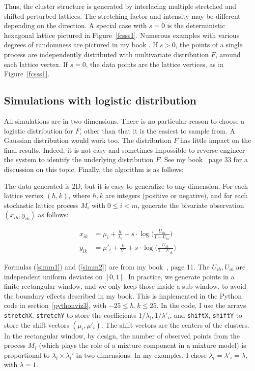 \documentclass[oneside,10pt]{book}
\begin{document}
Thus, the cluster structure is generated by interlacing multiple stretched and shifted perturbed lattices. The stretching factor and intensity may be different depending on the direction. A special case with $s=0$ is the deterministic hexagonal lattice pictured in Figure~\ref{fcsss1}. Numerous examples with various degrees of randomness are pictured in my book \cite{vgsimulnew}. If $s>0$, the points of a single process are independently distributed with multivariate distribution $F$, around each lattice vertex. If $s=0$, the data points are the lattice vertices, as in
Figure~\ref{fcsss1}.

\subsection{Simulations with logistic distribution}\label{fcsim}

All simulations are in two dimensions. There is no particular reason to choose a logistic distribution for $F$, other than that it is the easiest to sample from. A Gaussian distribution would work too. The distribution $F$ has little impact on the final results. Indeed, it is not easy
and sometimes impossible to
reverse-engineer the system to identify the underlying distribution $F$. See my book~\cite{vgsimulnew} page 33 for a discussion on this topic.
 Finally, the algorithm is as follows:


\noindent The data generated is 2D, but it is easy to generalize to any dimension. For each lattice vertex $(h,k)$, where $h,k$ are integers (positive or negative), and for each stochastic lattice process $M_i$ with $0\leq i < m$, generate the bivariate observation $(x_{ih},y_{ik})$ as follows:

\begin{align}
x_{ih} & =\mu_i + \frac{h}{\lambda_i} +s \cdot \log \Big(\frac{U_{ih}}{1-U_{ih}}\Big) \label{simm1}\\
y_{ik} & =\mu'_i+ \frac{k}{\lambda'_i} +s \cdot \log\Big(\frac{U_{ik}}{1-U_{ik}}\Big) \label{simm2}
\end{align}



\noindent Formulas (\ref{simm1}) and (\ref{simm2}) are from my book~\cite{vgsimulnew}, page 11. The $U_{ih},U_{ik}$ are independent uniform deviates on $[0,1]$. In practice, we generate points in a finite rectangular window, and we only keep those inside a sub-window, to avoid the boundary effects described in my book. This is implemented in the Python code in section~\ref{pythonviz3}, with $-25\leq h,k\leq 25$. In the code, I use the arrays \texttt{stretchX}, \texttt{stretchY} to store the coefficients
$1/\lambda_i,1/\lambda'_i$, and \texttt{shiftX}, \texttt{shiftY} to store the shift vectors $(\mu_i,\mu'_i)$. The shift vectors are the centers of the clusters. In the rectangular window, by design, the
number of
observed points from the process $M_i$ (which plays the role of a mixture component in a mixture model) is proportional to
$\lambda_i \times \lambda_i'$ in two dimensions. In my examples, I chose $\lambda_i=\lambda'_i=\lambda$, with $\lambda=1$.
\end{document}
